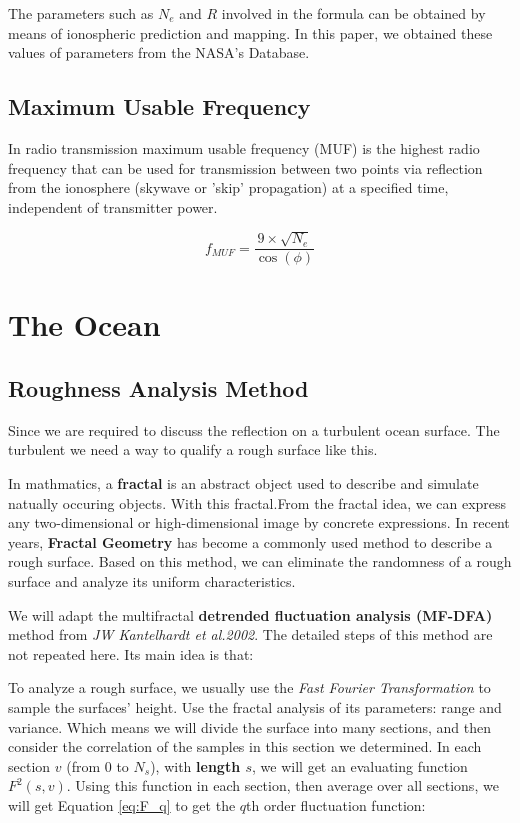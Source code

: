 \documentclass{mcmthesis}
\begin{document}
     The parameters such as $N_{e}$ and $R$ involved in the formula can be obtained by means of ionospheric prediction and mapping. In this paper, we obtained these values of parameters from the NASA's Database.

\subsection{Maximum Usable Frequency}

    In radio transmission maximum usable frequency (MUF) is the highest radio frequency that can be used for transmission between two points via reflection from the ionosphere (skywave or 'skip' propagation) at a specified time, independent of transmitter power\cite{davies1990ionospheric}.

    \begin{equation}\label{MUF_def}
      f_{MUF} = \frac{ 9 \times \sqrt{N_e} }{\cos(\phi)}
    \end{equation}


\section{The Ocean}

  \subsection{Roughness Analysis Method}
    Since we are required to discuss the reflection on a turbulent ocean surface. The turbulent  we need a way to qualify a rough surface like this.

    In mathmatics, a \textbf{fractal} is an abstract object used to describe and simulate natually occuring objects. With this fractal.From the fractal idea, we can express any two-dimensional or high-dimensional image by concrete expressions. In recent years, \textbf{Fractal Geometry} has become a commonly used method to describe a rough surface\cite{lang2015hydraulic,shibuichi1998super}. Based on this method, we can eliminate the randomness of a rough surface and analyze its uniform characteristics.

    We will adapt the multifractal \textbf{detrended fluctuation analysis (MF-DFA)} method from \emph{JW Kantelhardt et al.2002}\cite{kantelhardt2002multifractal}. The detailed steps of this method are not repeated here. Its main idea is that:

    To analyze a rough surface, we usually use the \emph{Fast Fourier Transformation} to sample the surfaces' height. Use the fractal analysis of its parameters: range and variance. Which means we will divide the surface into many sections, and then consider the correlation of the samples in this section we determined. In each section $v$ (from $0$ to $N_s$), with \textbf{length $s$}, we will get an evaluating function $F^2(s,v)$. Using this function in each section, then average over all sections, we will get Equation \ref{eq:F_q} to get the $q$th order fluctuation function:
\end{document}
